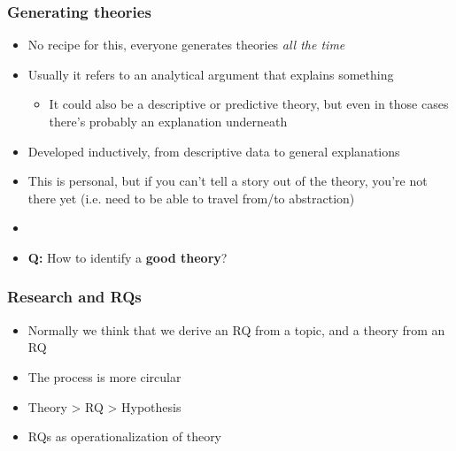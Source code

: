 \documentclass[aspectratio=43]{beamer}
\begin{document}
\begin{frame}
\frametitle{Generating theories}
\centering

\begin{itemize}
  \item<1-> No recipe for this, everyone generates theories \textit{all the time}
  \item Usually it refers to an analytical argument that explains something
  \begin{itemize}
    \item It could also be a descriptive or predictive theory, but even in those cases there's probably an explanation underneath
  \end{itemize}
  \item Developed inductively, from descriptive data to general explanations
  \item This is personal, but if you can't tell a story out of the theory, you're not there yet {\small (i.e. need to be able to travel from/to abstraction)}
  \item<2->[]
  \item<2-> \textbf{Q:} How to identify a \textbf{good theory}?
\end{itemize}

\end{frame}

\begin{frame}
\frametitle{Research and RQs}
\centering

\begin{itemize}[<+->]
  \item Normally we think that we derive an RQ from a topic, and a theory from an RQ
  \item The process is more circular
  \item Theory > RQ > Hypothesis
  \item RQs as operationalization of theory
\end{itemize}

\end{frame}

\begin{frame}
\frametitle{}
\centering


\end{frame}
\end{document}
